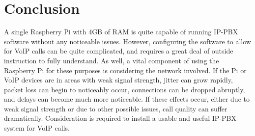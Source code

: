 \section{Conclusion}
    A single Raspberry Pi with 4GB of RAM is quite capable of running IP-PBX software without any noticeable issues. However, configuring the software to allow for VoIP calls can be quite complicated, and requires a great deal of outside instruction to fully understand. As well, a vital component of using the Raspberry Pi for these purposes is considering the network involved. If the Pi or VoIP devices are in areas with weak signal strength, jitter can grow rapidly, packet loss can begin to noticeably occur, connections can be dropped abruptly, and delays can become much more noticeable. If these effects occur, either due to weak signal strength or due to other possible issues, call quality can suffer dramatically. Consideration is required to install a usable and useful IP-PBX system for VoIP calls.